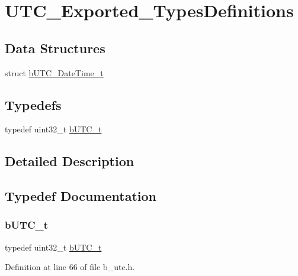 \hypertarget{group___u_t_c___exported___types_definitions}{}\section{U\+T\+C\+\_\+\+Exported\+\_\+\+Types\+Definitions}
\label{group___u_t_c___exported___types_definitions}
\subsection*{Data Structures}
\begin{DoxyCompactItemize}
\item 
struct \mbox{\hyperlink{structb_u_t_c___date_time__t}{b\+U\+T\+C\+\_\+\+Date\+Time\+\_\+t}}
\end{DoxyCompactItemize}
\subsection*{Typedefs}
\begin{DoxyCompactItemize}
\item 
typedef uint32\+\_\+t \mbox{\hyperlink{group___u_t_c___exported___types_definitions_ga17dd2ea12b8ac7d28b50c19f3e3d63ce}{b\+U\+T\+C\+\_\+t}}
\end{DoxyCompactItemize}


\subsection{Detailed Description}


\subsection{Typedef Documentation}
\mbox{\label{group___u_t_c___exported___types_definitions_ga17dd2ea12b8ac7d28b50c19f3e3d63ce}} 
\subsubsection{\texorpdfstring{b\+U\+T\+C\+\_\+t}{bUTC\_t}}
{\footnotesize\ttfamily typedef uint32\+\_\+t \mbox{\hyperlink{group___u_t_c___exported___types_definitions_ga17dd2ea12b8ac7d28b50c19f3e3d63ce}{b\+U\+T\+C\+\_\+t}}}



Definition at line 66 of file b\+\_\+utc.\+h.

